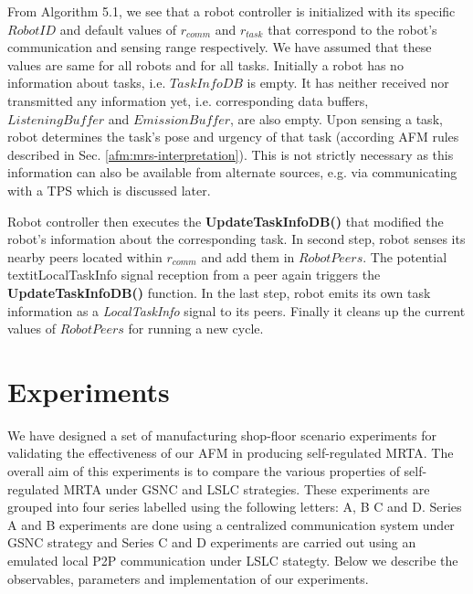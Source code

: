 \documentclass[final,5p,times,twocolumn]{elsarticle}
\begin{document}
From Algorithm 5.1, we see that a robot controller is initialized with its specific $RobotID$ and default values of $r_{comm}$ and $r_{task}$ that correspond to the robot's communication and sensing range respectively. We have assumed that these values are same for all robots and for all tasks. Initially a robot has no information about tasks, i.e. {$TaskInfoDB$} is empty. It has neither received nor transmitted any information yet, i.e. corresponding data buffers, $ListeningBuffer$ and $EmissionBuffer$, are also empty. Upon sensing a task, robot determines the task's pose and urgency of that task (according AFM rules described in Sec. \ref{afm:mrs-interpretation}). This is not strictly necessary as this information can also be available from alternate sources, e.g. via communicating with a TPS which is discussed later.

Robot controller then executes the \textbf{UpdateTaskInfoDB()} that modified the robot's information about the corresponding task. In second step, robot senses its nearby peers located within $r_{comm}$ and add them in $RobotPeers$. The potential textit{LocalTaskInfo} signal reception from a  peer again triggers the \textbf{UpdateTaskInfoDB()} function. In the last step, robot emits its own task information as a \textit{LocalTaskInfo} signal to its peers. Finally it cleans up the current values of $RobotPeers$ for running a new cycle.
\section{Experiments}
\label{sec:expt}
We have designed a set of manufacturing shop-floor scenario experiments for validating the effectiveness of our AFM in producing self-regulated MRTA. The overall aim of this experiments is to compare the various properties of self-regulated MRTA under GSNC and LSLC strategies. These experiments are grouped into four series labelled using the following letters: A, B C and D. Series A and B experiments are done using a centralized communication system under GSNC strategy and Series C and D experiments are carried out using an emulated local P2P communication under LSLC stategty. Below we describe the observables, parameters and implementation of our experiments.
\end{document}
